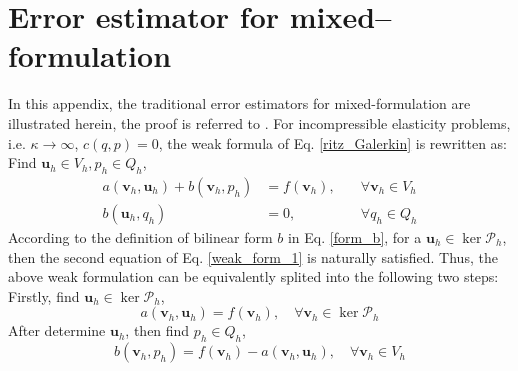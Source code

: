 \section{Error estimator for mixed--formulation}\label{error}
In this appendix, the traditional error estimators for mixed-formulation are illustrated herein, the proof is referred to \cite{brenner2008}.
For incompressible elasticity problems, i.e. $\kappa\rightarrow\infty$, $c(q,p)=0$, the weak formula of Eq. \eqref{ritz_Galerkin} is rewritten as:
Find $\boldsymbol u_h \in V_h, p_h \in Q_h$,
\begin{equation}\label{weak_form_1}
\begin{aligned}
    a(\boldsymbol v_h,\boldsymbol u_h) + b(\boldsymbol v_h,p_h) &= f(\boldsymbol v_h), \quad &\forall \boldsymbol v_h \in V_h \\
    b(\boldsymbol u_h,q_h) &= 0, \quad &\forall q_h \in Q_h
\end{aligned}
\end{equation}
According to the definition of bilinear form $b$ in Eq. \eqref{form_b},
for a $\boldsymbol u_h \in \ker \mathcal P_h$, then the second equation of Eq. \eqref{weak_form_1} is naturally satisfied. Thus, 
the above weak formulation can be equivalently splited into the following two steps: Firstly, 
find $\boldsymbol u_h \in \ker \mathcal P_h$,
\begin{equation} \label{weak_form_2}
a(\boldsymbol v_h,\boldsymbol u_h) = f(\boldsymbol v_h), \quad \forall \boldsymbol v_h \in \ker \mathcal P_h
\end{equation}
After determine $\boldsymbol u_h$, then find $p_h \in Q_h$,
\begin{equation}\label{weak_form_3}
b(\boldsymbol v_h, p_h) = f(\boldsymbol v_h) - a(\boldsymbol v_h, \boldsymbol u_h), \quad \forall \boldsymbol v_h \in V_h
\end{equation}

